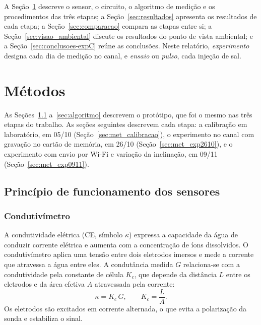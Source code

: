 \documentclass[12pt,a4paper]{article}
\begin{document}
A Seção~\ref{sec:metodos} descreve o sensor, o circuito, o algoritmo de medição e os procedimentos das três etapas; a Seção~\ref{sec:resultados} apresenta os resultados de cada etapa; a Seção~\ref{sec:comparacao} compara as etapas entre si; a Seção~\ref{sec:visao_ambiental} discute os resultados do ponto de vista ambiental; e a Seção~\ref{sec:conclusoes-expC} reúne as conclusões. Neste relatório, \emph{experimento} designa cada dia de medição no canal, e \emph{ensaio} ou \emph{pulso}, cada injeção de sal.



\section{Métodos}
\label{sec:metodos}

As Seções~\ref{sec:principio} a~\ref{sec:algoritmo} descrevem o protótipo, que foi o mesmo nas três etapas do trabalho. As seções seguintes descrevem cada etapa: a calibração em laboratório, em 05/10 (Seção~\ref{sec:met_calibracao}), o experimento no canal com gravação no cartão de memória, em 26/10 (Seção~\ref{sec:met_exp2610}), e o experimento com envio por Wi-Fi e variação da inclinação, em 09/11 (Seção~\ref{sec:met_exp0911}).

\subsection{Princípio de funcionamento dos sensores}
\label{sec:principio}

\subsubsection{Condutivímetro}

A condutividade elétrica (CE, símbolo $\kappa$) expressa a capacidade da água de conduzir corrente elétrica e aumenta com a concentração de íons dissolvidos. O condutivímetro aplica uma tensão entre dois eletrodos imersos e mede a corrente que atravessa a água entre eles. A condutância medida $G$ relaciona-se com a condutividade pela constante de célula $K_c$, que depende da distância $L$ entre os eletrodos e da área efetiva $A$ atravessada pela corrente:
\begin{equation}
  \kappa = K_c\,G, \qquad K_c = \frac{L}{A}.
  \label{eq:celula}
\end{equation}
Os eletrodos são excitados em corrente alternada, o que evita a polarização da sonda e estabiliza o sinal.
\end{document}
